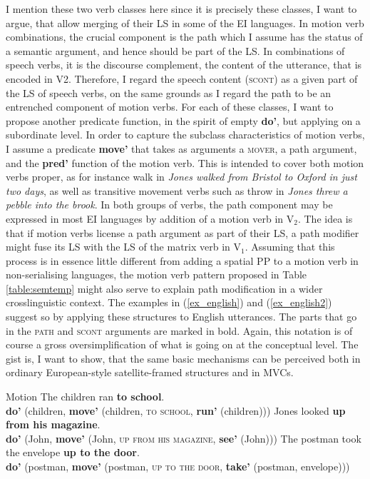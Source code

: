 I mention these two verb classes here since it is precisely these classes, I want to argue, that allow merging of their LS in some of the EI languages. In motion verb combinations, the crucial component is the path which I assume has the status of a semantic argument, and hence should be part of the LS. In combinations of speech verbs, it is the discourse complement, the content of the utterance, that is encoded in V2. Therefore, I regard the speech content (\textsc{scont}) as a given part of the LS of speech verbs, on the same grounds as I regard the path to be an entrenched component of motion verbs. For each of these classes, I want to propose another predicate function, in the spirit of empty \textbf{do'}, but applying on a subordinate level. In order to capture the subclass characteristics of motion verbs, I assume a predicate \textbf{move'} that takes as arguments a \textsc{mover}, a path argument, and the \textbf{pred'} function of the motion verb. This is intended to cover both motion verbs proper, as for instance walk in \textit{Jones walked from Bristol to Oxford in just two days}, as well as transitive movement verbs such as throw in \textit{Jones threw a pebble into the brook}. In both groups of verbs, the path component may be expressed in most EI languages by addition of a motion verb in V$_2$. The idea is that if motion verbs license a path argument as part of their LS, a path modifier might fuse its LS with the LS of the matrix verb in V$_1$. Assuming that this process is in essence little different from adding a spatial PP to a motion verb in non-serialising languages, the motion verb pattern proposed in Table \ref{table:semtemp} might also serve to explain path modification in a wider crosslinguistic context. The examples in (\ref{ex_english}) and (\ref{ex_english2}) suggest so by applying these structures to English utterances. The parts that go in the \textsc{path} and \textsc{scont} arguments are marked in bold. Again, this notation is of course a gross oversimplification of what is going on at the conceptual level. The gist is, I want to show, that the same basic mechanisms can be perceived both in ordinary European-style satellite-framed structures and in MVCs.


\ea Motion \label{ex_english}
\ea The children ran \textbf{to school}. \\
\textbf{do'} (children, \textbf{move'} (children, \textsc{to school}, \textbf{run'} (children)))
\ex Jones looked \textbf{up from his magazine}. \\
\textbf{do'} (John, \textbf{move'} (John, \textsc{up from his magazine}, \textbf{see'} (John)))
\ex The postman took the envelope \textbf{up to the door}. \\
\textbf{do'} (postman, \textbf{move'} (postman, \textsc{up to the door}, \textbf{take'} (postman, envelope)))
\z
\z

